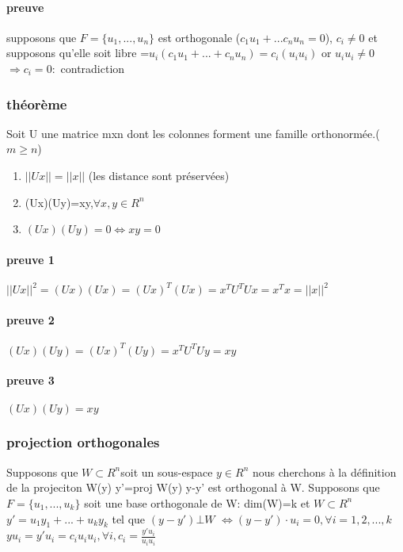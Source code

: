\documentclass[a4paper,10pt]{article}
\begin{document}
\paragraph{preuve}
supposons que $F=\{u_1,...,u_n\}$ est orthogonale ($c_1u_1+...c_nu_n=0$), $c_i\neq 0$
\newline
et supposons qu'elle soit libre
=$u_i(c_1u_1+...+c_nu_n)=c_i(u_iu_i)$
\newline
or $u_iu_i\neq 0$
\newline
$\Rightarrow c_i=0:$ contradiction
\subsubsection{théorème}
Soit U une matrice mxn dont les colonnes forment une famille orthonormée.($m\geq n$)
\begin{enumerate}
 \item $||Ux||=||x||$ (les distance sont préservées)
 \item (Ux)(Uy)=xy,$\forall x,y\in R^n$
 \item $(Ux)(Uy)=0 \Leftrightarrow xy=0$
\end{enumerate}
\paragraph{preuve 1}
$||Ux||^2=(Ux)(Ux)=(Ux)^T(Ux)=x^TU^TUx=x^Tx=||x||^2$
\paragraph{preuve 2}
$(Ux)(Uy)=(Ux)^T(Uy)=x^TU^TUy=xy$
\paragraph{preuve 3}
$(Ux)(Uy)=xy$
\subsubsection{projection orthogonales}
Supposons que $W\subset R^n $soit un sous-espace
\newline
$y\in R^n$
\newline
nous cherchons à la définition de la projeciton W(y)
\newline
y'=proj W(y)
\newline
y-y' est orthogonal à W.
\newline
Supposons que $F=\{u_1,...,u_k\}$ soit une base orthogonale de W: dim(W)=k et $W\subset R^n$
\newline
$y'=u_1y_1+...+u_ky_k$ tel que $(y-y')\bot W$
\newline
$\Leftrightarrow (y-y')\cdot u_i=0,\forall i=1,2,...,k$
\newline
$yu_i=y'u_i =c_iu_iu_i, \forall i, c_i=\frac{y'u_i}{u_iu_i}$
\end{document}
